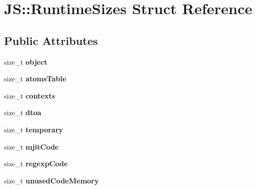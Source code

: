 \hypertarget{struct_j_s_1_1_runtime_sizes}{\section{J\-S\-:\-:Runtime\-Sizes Struct Reference}
\label{struct_j_s_1_1_runtime_sizes}
}
\subsection*{Public Attributes}
\begin{DoxyCompactItemize}
\item 
\hypertarget{struct_j_s_1_1_runtime_sizes_a2e3ca757401fe409463919d3a279182f}{size\-\_\-t {\bfseries object}}\label{struct_j_s_1_1_runtime_sizes_a2e3ca757401fe409463919d3a279182f}

\item 
\hypertarget{struct_j_s_1_1_runtime_sizes_aa87328153daa394271600de117953ab3}{size\-\_\-t {\bfseries atoms\-Table}}\label{struct_j_s_1_1_runtime_sizes_aa87328153daa394271600de117953ab3}

\item 
\hypertarget{struct_j_s_1_1_runtime_sizes_ac6f388028d0b11b87235e845328e11e6}{size\-\_\-t {\bfseries contexts}}\label{struct_j_s_1_1_runtime_sizes_ac6f388028d0b11b87235e845328e11e6}

\item 
\hypertarget{struct_j_s_1_1_runtime_sizes_aa141c79367b6b08052ac4ea7db0c5a72}{size\-\_\-t {\bfseries dtoa}}\label{struct_j_s_1_1_runtime_sizes_aa141c79367b6b08052ac4ea7db0c5a72}

\item 
\hypertarget{struct_j_s_1_1_runtime_sizes_a445dbdc325d9390c6593837d72219c0d}{size\-\_\-t {\bfseries temporary}}\label{struct_j_s_1_1_runtime_sizes_a445dbdc325d9390c6593837d72219c0d}

\item 
\hypertarget{struct_j_s_1_1_runtime_sizes_a8dcc99701a5555621c735cc135febbeb}{size\-\_\-t {\bfseries mjit\-Code}}\label{struct_j_s_1_1_runtime_sizes_a8dcc99701a5555621c735cc135febbeb}

\item 
\hypertarget{struct_j_s_1_1_runtime_sizes_a94799a73d904cffb32a88501b284d9fa}{size\-\_\-t {\bfseries regexp\-Code}}\label{struct_j_s_1_1_runtime_sizes_a94799a73d904cffb32a88501b284d9fa}

\item 
\hypertarget{struct_j_s_1_1_runtime_sizes_a6fabc44fed7d9a7414073a2313928522}{size\-\_\-t {\bfseries unused\-Code\-Memory}}\label{struct_j_s_1_1_runtime_sizes_a6fabc44fed7d9a7414073a2313928522}


\end{DoxyCompactItemize}

